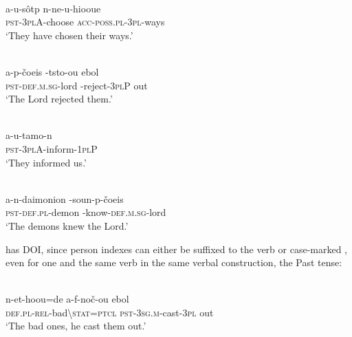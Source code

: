 \documentclass[output=paper]{LSP/langsci}
\begin{document}
\begin{exe}
\ex%
\label{05-gr-ex:8}
\\
\gll a-u-sôtp n-ne-u-hiooue\\
\textsc{pst-3pl}A-choose \textsc{acc-poss.pl-3pl}-ways\\
\glt ‘They have chosen their ways.’ %
\end{exe}

\begin{exe}
\ex%
\label{05-gr-ex:9}
\\
\gll a-p-čoeis -tsto-ou ebol\\
\textsc{pst-def.m.sg}-lord -reject-\textsc{3pl}P out\\
\glt ‘The Lord rejected them.’ %
\end{exe}

\begin{exe}
\ex%
\label{05-gr-ex:10}
\\
\gll a-u-tamo-n\\
\textsc{pst-3pl}A-inform-\textsc{1pl}P\\
\glt ‘They informed us.’  %
\end{exe}

\begin{exe}
\ex%
\label{05-gr-ex:11}
\\
\gll a-n-daimonion -soun-p-čoeis\\
\textsc{pst-def.pl}-demon -know-\textsc{def.m.sg}-lord\\
\glt ‘The demons knew the Lord.’  %
\end{exe}


 has DOI, since person indexes can either be suffixed to the verb  or case-marked , even for one and the same verb in the same verbal construction, \eg the Past tense:

\begin{exe}
\ex%
\label{05-gr-ex:12}
\\
\gll n-et-hoou=de a-f-noč-ou ebol\\
\textsc{def.pl-rel}-bad{\textbackslash}\textsc{stat=ptcl} \textsc{pst-3sg.m}-cast-\textsc{3pl} out\\
\glt ‘The bad ones, he cast them out.’  %
\end{exe}
\end{document}
